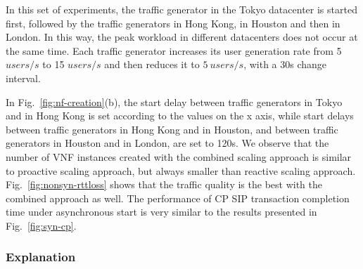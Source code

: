 In this set of experiments, %
the traffic generator in the Tokyo datacenter is started first, followed by the traffic generators in Hong Kong, in Houston and then in London. %
 In this way, the peak workload in different datacenters does not occur at the same time. Each traffic generator increases its user generation rate from 5 $users/s$ to 15 $users/s$ and then reduces it to $5~users/s$, with a 30s change interval.

In Fig.~\ref{fig:nf-creation}(b), the start delay between traffic generators in Tokyo and in Hong Kong is set according to the values on the x axis, while start delays between traffic generators in Hong Kong and in Houston, and between traffic generators in Houston and in London, are set to 120s. We observe that the number of VNF instances created with the combined scaling approach is similar to proactive scaling approach, but always smaller than reactive scaling approach. Fig.~\ref{fig:nonsyn-rttloss} shows that the traffic quality is the best with the combined approach as well. The performance of CP SIP transaction completion time under asynchronous start is very similar to the results presented in Fig.~\ref{fig:syn-cp}. %


\subsubsection{Explanation}

